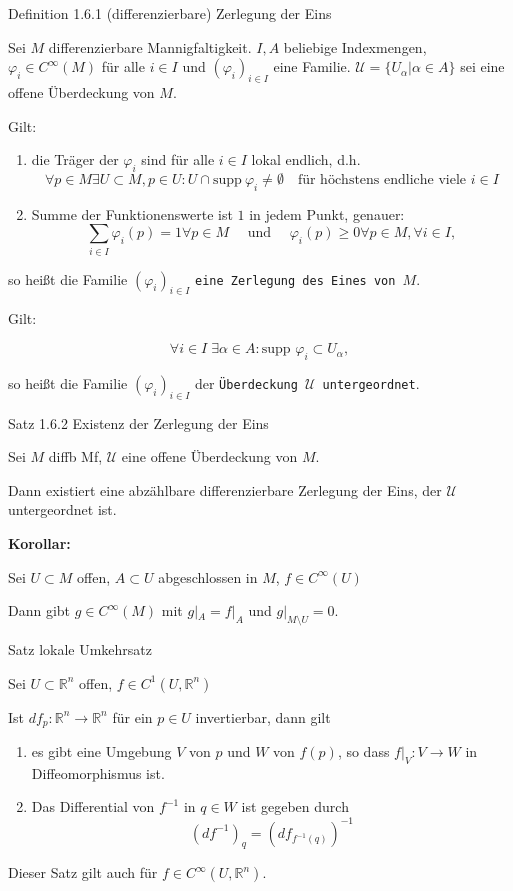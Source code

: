 \documentclass[a6paper,11pt,grid=front]{kartei}
\newcommand{\fl}[1]{\begin{flushleft}
 #1 \end{flushleft}}
\newcommand{\R}{\mathbb{R}}
\newcounter{satz}
\begin{document}
\nonameyet
{Definition 1.6.1} {\small (differenzierbare) Zerlegung der Eins}
{
	\scriptsize
Sei $M$ differenzierbare Mannigfaltigkeit. $I,A$ beliebige Indexmengen,
$\varphi_i \in C^\infty(M)$ für alle $i\in I$ und $(\varphi_i)_{i\in I}$ 
eine Familie. $\mathcal{U} = \{U_\alpha | \alpha \in A\}$ sei eine offene 
Überdeckung von $M$.
\fl{Gilt: }
\begin{enumerate}[1.]
\item die Träger der $\varphi_i$ sind für alle $i\in I$ lokal endlich, d.h.
\[
\forall p\in M \exists U\subset M, p\in U: U \cap \text{supp}\:\varphi_i \neq \emptyset
\quad \text{für höchstens endliche viele $i \in I$}
\]
\item Summe der Funktionenswerte ist $1$ in jedem Punkt, genauer:
\[
\sum_{i\in I} \varphi_i(p) = 1 \forall p\in M 
\quad \text{ und } \quad
\varphi_i(p) \geq 0 \forall p\in M,\forall i \in I,
\]
\end{enumerate}
\fl{so heißt die Familie $(\varphi_i)_{i\in I}$ 
\texttt{eine Zerlegung des Eines von $M$}.}
%
\fl{Gilt:}
\[
\forall i \in I \; \exists \alpha \in A: \text{supp }\varphi_i \subset U_\alpha,
\]
\fl{so heißt die Familie $(\varphi_i)_{i\in I}$ der \texttt{Überdeckung 
$\mathcal{U}$ untergeordnet}.}
}
{}

\nonameyet
{Satz 1.6.2} {Existenz der Zerlegung der Eins}
{
	\small
Sei $M$ diffb Mf, $\mathcal{U}$ eine offene Überdeckung von $M$.
\fl{Dann existiert eine abzählbare differenzierbare Zerlegung der Eins,
der $\mathcal{U}$ untergeordnet ist.}
\fl{\textbf{Korollar:}} 
Sei $U \subset M$ offen, $A \subset U$ abgeschlossen in $M$, $f\in C^\infty(U)$
\fl{Dann gibt $g\in C^\infty(M)$ mit $g|_A = f|_A$ und $g|_{M\setminus U} = 0$.}
}
{}

\nonameyet
{Satz} {lokale Umkehrsatz}
{
Sei $U\subset \R^n$ offen, $f\in C^1(U,\R^n)$
\fl{Ist $df_p : \R^n \to \R^n$ für ein $p \in U$ invertierbar, dann gilt}
\begin{enumerate}[1.]
\item es gibt eine Umgebung $V$ von $p$ und $W$ von $f(p)$, 
so dass $f|_V : V \to W$ in Diffeomorphismus ist. 
\item Das Differential von $f^ {-1}$ in $q \in W$ ist gegeben durch
\[
(df^{-1})_q = (df_{f^{-1}(q)})^{-1}
\]
\end{enumerate}
Dieser Satz gilt auch für $f\in C^\infty(U,\R^n)$.
}
{}
\end{document}

